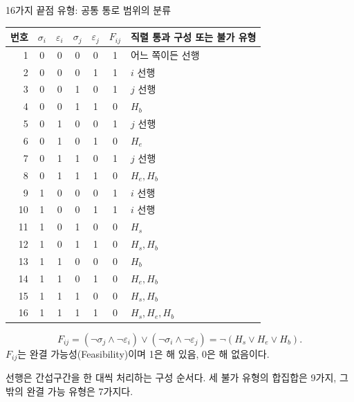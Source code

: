\begin{frame}{16가지 끝점 유형: 공통 통로 범위의 분류}
\footnotesize\renewcommand{\arraystretch}{1.02}
\begin{center}\begin{tabular}{rcccccl}\toprule
번호 & $\sigma_i$ & $\varepsilon_i$ & $\sigma_j$ & $\varepsilon_j$ & $F_{ij}$ & 직렬 통과 구성 또는 불가 유형\\\midrule
1 & 0&0&0&0 & 1 & 어느 쪽이든 선행\\
2 & 0&0&0&1 & 1 & $i$ 선행\\
3 & 0&0&1&0 & 1 & $j$ 선행\\
4 & 0&0&1&1 & 0 & $H_b$\\
5 & 0&1&0&0 & 1 & $j$ 선행\\
6 & 0&1&0&1 & 0 & $H_e$\\
7 & 0&1&1&0 & 1 & $j$ 선행\\
8 & 0&1&1&1 & 0 & $H_e,H_b$\\
9 & 1&0&0&0 & 1 & $i$ 선행\\
10 & 1&0&0&1 & 1 & $i$ 선행\\
11 & 1&0&1&0 & 0 & $H_s$\\
12 & 1&0&1&1 & 0 & $H_s,H_b$\\
13 & 1&1&0&0 & 0 & $H_b$\\
14 & 1&1&0&1 & 0 & $H_e,H_b$\\
15 & 1&1&1&0 & 0 & $H_s,H_b$\\
16 & 1&1&1&1 & 0 & $H_s,H_e,H_b$\\\bottomrule
\end{tabular}\end{center}
\begin{equation}
 F_{ij}=(\neg\sigma_j\land\neg\varepsilon_i)
 \lor(\neg\sigma_i\land\neg\varepsilon_j)
 =\neg(H_s\lor H_e\lor H_b).
 \tag{38}
\end{equation}
\scriptsize $F_{ij}$는 완결 가능성(Feasibility)이며 1은 해 있음, 0은 해 없음이다.\par 선행은 간섭구간을 한 대씩 처리하는 구성 순서다.
세 불가 유형의 합집합은 9가지, 그 밖의 완결 가능 유형은 7가지다.
\end{frame}

